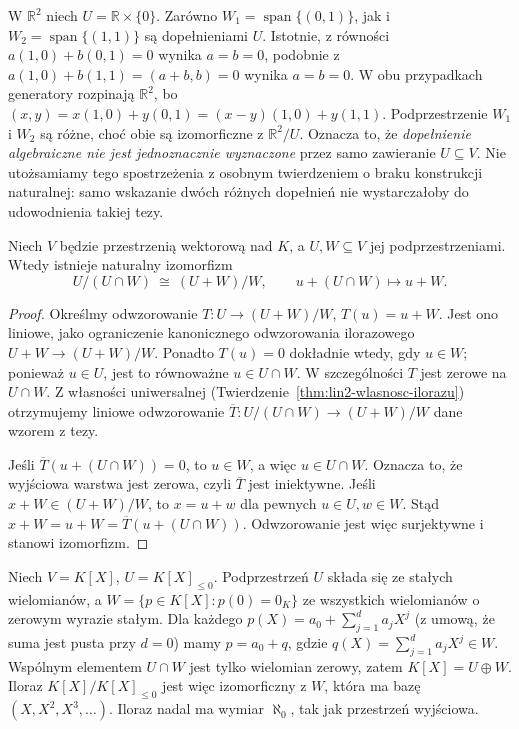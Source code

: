 \begin{przyklad}
\label{prz:lin2-dopelnienia}
W \(\mathbb R^2\) niech \(U=\mathbb R\times\{0\}\).
Zarówno \(W_1=\operatorname{span}\{(0,1)\}\),
jak i \(W_2=\operatorname{span}\{(1,1)\}\)
są dopełnieniami \(U\).
Istotnie, z równości
\(a(1,0)+b(0,1)=0\) wynika \(a=b=0\),
podobnie z
\(a(1,0)+b(1,1)=(a+b,b)=0\)
wynika \(a=b=0\).
W obu przypadkach generatory rozpinają
\(\mathbb R^2\), bo
\((x,y)=x(1,0)+y(0,1)
=(x-y)(1,0)+y(1,1)\).
Podprzestrzenie \(W_1\) i \(W_2\)
są różne, choć obie są izomorficzne
z \(\mathbb R^2/U\). Oznacza to, że
\emph{dopełnienie algebraiczne nie jest
jednoznacznie wyznaczone} przez samo zawieranie
\(U\subseteq V\). Nie utożsamiamy tego
spostrzeżenia z osobnym twierdzeniem o braku
konstrukcji naturalnej: samo wskazanie dwóch
różnych dopełnień nie wystarczałoby
do udowodnienia takiej tezy.
\end{przyklad}

\begin{twierdzenie}
\label{thm:lin2-iloraz-sumy}
Niech \(V\) będzie przestrzenią wektorową nad \(K\),
a \(U,W\subseteq V\) jej podprzestrzeniami.
Wtedy istnieje naturalny izomorfizm
\[
 U/(U\cap W)\ \cong\ (U+W)/W,
 \qquad u+(U\cap W)\longmapsto u+W.
\]
\end{twierdzenie}
\begin{proof}
Określmy odwzorowanie
\(T\colon U\to (U+W)/W\),
\(T(u)=u+W\).
Jest ono liniowe, jako ograniczenie
kanonicznego odwzorowania ilorazowego
\(U+W\to(U+W)/W\).
Ponadto \(T(u)=0\) dokładnie wtedy,
gdy \(u\in W\); ponieważ \(u\in U\),
jest to równoważne \(u\in U\cap W\).
W szczególności \(T\) jest zerowe
na \(U\cap W\).
Z własności uniwersalnej
(Twierdzenie~\ref{thm:lin2-wlasnosc-ilorazu})
otrzymujemy liniowe odwzorowanie
\(\overline T\colon U/(U\cap W)\to (U+W)/W\)
dane wzorem z tezy.

Jeśli \(\overline T(u+(U\cap W))=0\),
to \(u\in W\), a więc \(u\in U\cap W\).
Oznacza to, że wyjściowa warstwa jest zerowa,
czyli \(\overline T\) jest iniektywne.
Jeśli \(x+W\in(U+W)/W\), to
\(x=u+w\) dla pewnych \(u\in U,w\in W\).
Stąd \(x+W=u+W=\overline T(u+(U\cap W))\).
Odwzorowanie jest więc surjektywne
i stanowi izomorfizm.
\end{proof}

\begin{przyklad}
\label{prz:lin2-iloraz-wielomiany}
Niech \(V=K[X]\), \(U=K[X]_{\leq0}\).
Podprzestrzeń \(U\) składa się ze stałych wielomianów,
a \(W=\{p\in K[X]:p(0)=0_K\}\)
ze wszystkich wielomianów o zerowym wyrazie stałym.
Dla każdego \(p(X)=a_0+\sum_{j=1}^d a_jX^j\)
(z umową, że suma jest pusta przy \(d=0\))
mamy \(p=a_0+q\), gdzie
\(q(X)=\sum_{j=1}^d a_jX^j\in W\). Wspólnym elementem
\(U\cap W\) jest tylko wielomian zerowy,
zatem \(K[X]=U\oplus W\).
Iloraz \(K[X]/K[X]_{\leq0}\) jest więc
izomorficzny z \(W\), która ma bazę
\((X,X^2,X^3,\ldots)\).
Iloraz nadal ma wymiar \(\aleph_0\),
tak jak przestrzeń wyjściowa.
\end{przyklad}

